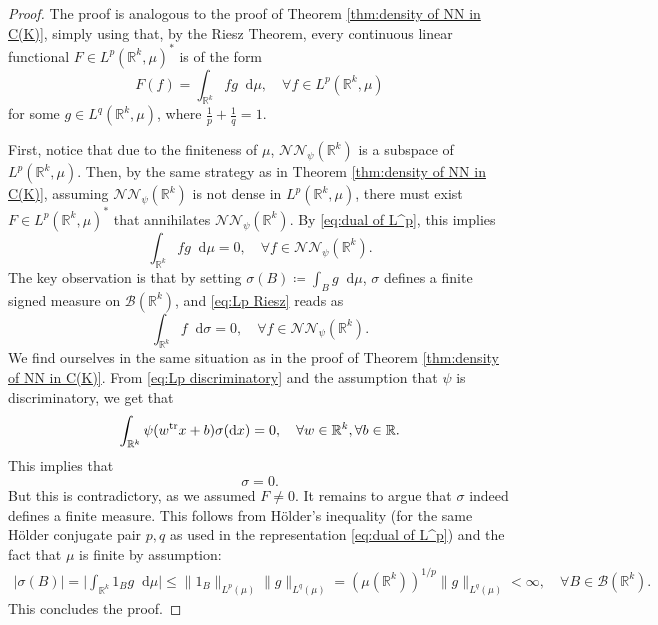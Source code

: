 \documentclass[11pt,a4paper,twoside,openany]{report}
\numberwithin{equation}{section}
\newcommand{\diff}{\mathop{}\!\mathrm{d}}
\theoremstyle{plain} %
\theoremstyle{definition} %
\theoremstyle{remark} %
\begin{document}
\begin{proof}
    The proof is analogous to the proof of Theorem \ref{thm:density of NN in C(K)}, simply using that, by the Riesz Theorem, every continuous linear functional  \(F\in L^p(\mathbb{R}^k,\mu)^*\) is of the form
    \begin{equation}\label{eq:dual of L^p}
        F(f)=\int_{\mathbb{R}^k}fg\diff \mu,\quad\forall f\in L^p(\mathbb{R}^k,\mu)
    \end{equation} for some \(g\in L^q(\mathbb{R}^k,\mu)\), where \(\frac{1}{p}+\frac{1}{q}=1\). 

    
   First, notice that due to the finiteness of \(\mu\), \(\mathcal{NN}_{\psi}(\mathbb{R}^k)\) is a subspace of  \(L^p(\mathbb{R}^k,\mu)\). Then, by the same strategy as in Theorem \ref{thm:density of NN in C(K)}, assuming \(\mathcal{NN}_{\psi}(\mathbb{R}^k)\) is not dense in \(L^p(\mathbb{R}^k,\mu)\), there must exist \(F\in L^p(\mathbb{R}^k,\mu)^*\) that annihilates \(\mathcal{NN}_{\psi}(\mathbb{R}^k)\). By \eqref{eq:dual of L^p}, this implies
    \begin{equation}\label{eq:Lp Riesz}
        \int_{\mathbb{R}^k}fg\diff \mu=0,\quad\forall f\in \mathcal{NN}_{\psi}(\mathbb{R}^k).
    \end{equation}
The key observation is that by setting \(\sigma(B)\coloneqq\int_B g\diff \mu\), \(\sigma\) defines a finite signed measure on \(\mathcal{B}(\mathbb{R}^k)\), and 
\eqref{eq:Lp Riesz} reads as 
\begin{equation}\label{eq:Lp discriminatory}
        \int_{\mathbb{R}^k}f\diff \sigma=0,\quad\forall f\in \mathcal{NN}_{\psi}(\mathbb{R}^k).
\end{equation}
We find ourselves in the same situation as in the proof of Theorem \ref{thm:density of NN in C(K)}.
    From \eqref{eq:Lp discriminatory} and the assumption that \(\psi\) is discriminatory, we get that 
   \begin{equation*}
        \int_{\mathbb{R}^k}\psi(w^{\rm{tr}}x+b) \sigma(\diff x)=0,\quad\forall w\in\mathbb{R}^k,\forall b\in\mathbb{R}.
\end{equation*}
This implies that
    \begin{equation*}
        \sigma = 0.
    \end{equation*}
    But this is contradictory, as we assumed \(F\neq 0\). It remains to argue that \(\sigma\) indeed defines a finite measure. 
    This follows from Hölder's inequality (for the same Hölder conjugate pair \(p,q\) as used in the representation \eqref{eq:dual of L^p}) and the fact that \(\mu\) is finite by assumption:
    \begin{align*}
        |\sigma(B)|=\bigg|\int_{\mathbb{R}^k}1_B g\diff \mu\bigg|\leq \lVert 1_{B}\rVert_{L^p(\mu)}\lVert g \rVert_{L^q(\mu)}=(\mu(\mathbb{R}^k))^{1/p}\lVert g\rVert_{L^q(\mu)}<\infty,\quad\forall B\in \mathcal{B}(\mathbb{R}^k).
    \end{align*}
    This concludes the proof.
    \end{proof}
\end{document}
